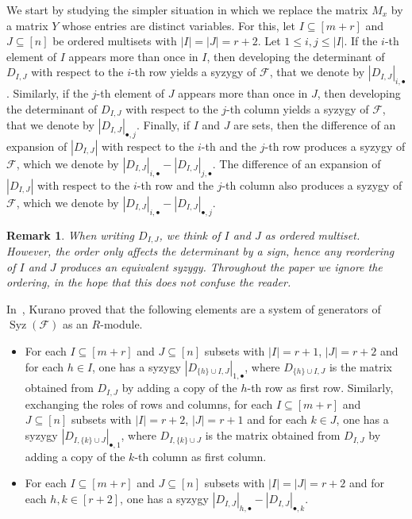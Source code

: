 \documentclass[utf8,latin1]{article}
\newtheorem{remark}[theorem]{Remark}
\DeclareMathOperator{\Syz}{Syz}
\begin{document}
We start by studying the simpler situation in which we replace the matrix $M_x$ by a matrix $Y$ whose entries are distinct variables.
For this, let $I\subseteq [m+r]$ and $J\subseteq [n]$ be ordered multisets with $|I|=|J|=r+2$. Let $1\leq i,j\leq |I|$. If the $i$-th element of $I$ appears more than once in $I$, then developing the determinant of $D_{I,J}$ with respect to the $i$-th row yields a syzygy of $\mathcal{F}$, that we denote by $|D_{I,J}|_{i,\bullet}$. 
Similarly, if the $j$-th element of $J$ appears more than once in $J$, then developing the determinant of $D_{I,J}$ with respect to the $j$-th column yields a syzygy of $\mathcal{F}$, that we denote by $|D_{I,J}|_{\bullet,j}$.
Finally, if $I$ and $J$ are sets, then the difference of an expansion of $|D_{I,J}|$ with respect to the $i$-th and the $j$-th row produces a syzygy of $\mathcal{F}$, which we denote by $|D_{I,J}|_{i,\bullet}-|D_{I,J}|_{j,\bullet}.$ The difference of an expansion of $|D_{I,J}|$ with respect to the $i$-th row and the $j$-th column also produces a syzygy of $\mathcal{F}$, which we denote by $|D_{I,J}|_{i,\bullet}-|D_{I,J}|_{\bullet,j}.$ 

\begin{remark}
When writing $D_{I,J}$, we think of $I$ and $J$ as ordered multiset. However, the order only affects the determinant by a sign, hence any reordering of $I$ and $J$ produces an equivalent syzygy. Throughout the paper we ignore the ordering, in the hope that this does not confuse the reader.
\end{remark}

In~\cite[Theorem 5.1]{K98}, Kurano proved that the following elements are a system of generators of $\Syz(\mathcal{F})$ as an $R$-module.

\begin{itemize}
\item[Type I:] For each $I\subseteq [m+r]$ and $J\subseteq [n]$ subsets with $|I|=r+1$, $|J|=r+2$ and for each $h\in I$, one has a syzygy $|D_{\{h\}\cup I,J}|_{1,\bullet}$, where $D_{\{h\}\cup I,J}$ is the matrix obtained from $D_{I,J}$ by adding a copy of the $h$-th row as first row.
Similarly, exchanging the roles of rows and columns, for each $I\subseteq [m+r]$ and $J\subseteq [n]$ subsets with $|I|=r+2$, $|J|=r+1$ and for each $k\in J$, one has a syzygy $|D_{I,\{k\}\cup J}|_{\bullet,1}$, where $D_{I,\{k\}\cup J}$ is the matrix obtained from $D_{I,J}$ by adding a copy of the $k$-th column as first column.
\item[Type II:] For each $I\subseteq [m+r]$ and $J\subseteq [n]$ subsets with $|I|=|J|=r+2$ and for each $h,k\in[r+2]$, one has a syzygy $|D_{I,J}|_{h,\bullet}-|D_{I,J}|_{\bullet,k}$.
\end{itemize}
\end{document}
